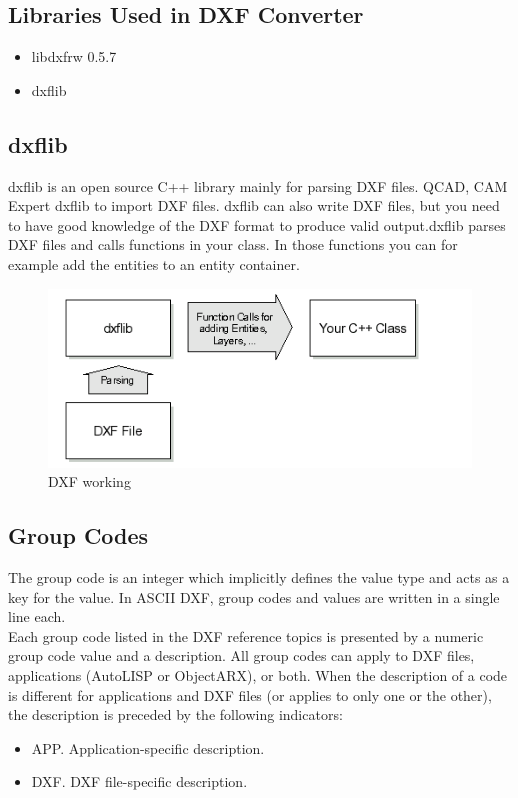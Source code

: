 \subsection{Libraries Used in DXF Converter}
\begin{itemize}
\item libdxfrw 0.5.7
\item dxflib
\end{itemize}

\subsection{dxflib}
dxflib is an open source C++ library mainly for parsing DXF files. QCAD, CAM Expert   dxflib to import DXF files. dxflib can also write DXF files, but you need to have good knowledge of the DXF format to produce valid output.dxflib parses DXF files and calls functions in your class. In those functions you can for example add the entities to an entity container.\\
\begin{figure} [h]
\centering
\includegraphics[scale=0.3]{images/dxf.png}
\caption{DXF working}
\end{figure}

\subsection{Group Codes}
The group code is an integer which implicitly defines the value type and acts as a key for the value. In ASCII DXF, group codes and values are written in a single line each.\\
Each group code listed in the DXF reference topics is presented by a numeric
group code value and a description. All group codes can apply to DXF files,
applications (AutoLISP or ObjectARX), or both. When the description of a code
is different for applications and DXF files (or applies to only one or the other),
the description is preceded by the following indicators:\\
\begin{itemize}
\item APP. Application-specific description.
\item DXF. DXF file-specific description.
\end{itemize}

